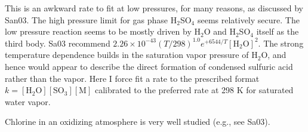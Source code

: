 \documentclass[12pt,landscape]{article}
\newcounter{reaction}
\begin{document}
  This is an awkward rate to fit at low pressures, for many reasons, as discussed by San03.
The high pressure limit for gas phase H$_2$SO$_4$ seems relatively secure.
The low pressure reaction seems to be mostly driven by H$_2$O and H$_2$SO$_4$ itself as the third body.
Sa03 recommend $2.26\times 10^{-43} \left(T/298 \right)^{1.0} e^{+6544/T} \left[\mathrm{H}_2\mathrm{O}\right]^2$.
The strong temperature dependence builds in the saturation vapor pressure of H$_2$O, and hence would appear to describe the
direct formation of condensed sulfuric acid rather than the vapor.  Here I force fit a rate to the prescribed format
$k=\left[\mathrm{H}_2\mathrm{O}\right]\left[\mathrm{SO}_3\right]\left[\mathrm{M}\right]$ calibrated to the preferred rate at 298 K
for saturated water vapor.

 Chlorine in an oxidizing atmosphere is very well studied (e.g., see Sa03).
\end{document}

